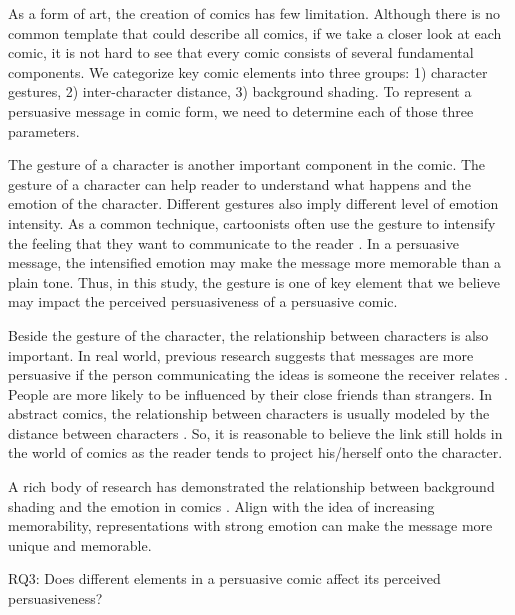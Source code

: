 As a form of art, the creation of comics has few limitation. Although there is no common template that could describe all comics, if we take a closer look at each comic, it is not hard to see that every comic consists of several fundamental components. We categorize key comic elements into three groups: 1) character gestures, 2) inter-character distance, 3) background shading. To represent a persuasive message in comic form, we need to determine each of those three parameters.

The gesture of a character is another important component in the comic. The gesture of a character can help reader to understand what happens and the emotion of the character. Different gestures also imply different level of emotion intensity. As a common technique, cartoonists often use the gesture to intensify the feeling that they want to communicate to the reader \cite{scott1993understanding}. In a persuasive message, the intensified emotion may make the message more memorable than a plain tone. Thus, in this study, the gesture is one of key element that we believe may impact the perceived persuasiveness of a persuasive comic.

Beside the gesture of the character, the relationship between characters is also important. In real world, previous research suggests that messages are more persuasive if the person communicating the ideas is someone the receiver relates \cite{daddis2008influence,merga2014peer,shin2013user}. People are more likely to be influenced by their close friends than strangers. In abstract comics, the relationship between characters is usually modeled by the distance between characters \cite{scott1993understanding}. So, it is reasonable to believe the link still holds in the world of comics as the reader tends to project his/herself onto the character.

A rich body of research has demonstrated the relationship between background shading and the emotion in comics \cite{scott1993understanding}. Align with the idea of increasing memorability, representations with strong emotion can make the message more unique and memorable.

RQ3: Does different elements in a persuasive comic affect its perceived persuasiveness?
